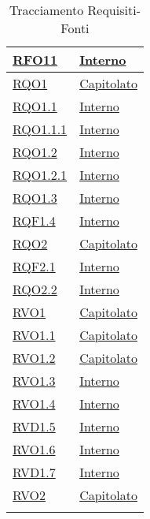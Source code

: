 \begin{longtable}{|>{\centering}m{5cm}|m{5cm}<{\centering}|}
\hyperlink{RFO11}{RFO11} &  \hyperlink{Interno}{Interno}\\ \hline

\hyperlink{RQO1}{RQO1} & \hyperlink{Capitolato}{Capitolato}\\ \hline
\hyperlink{RQO1.1}{RQO1.1} &  \hyperlink{Interno}{Interno}\\ \hline

\hyperlink{RQO1.1.1}{RQO1.1.1} &  \hyperlink{Interno}{Interno}\\ \hline

\hyperlink{RQO1.2}{RQO1.2} & \hyperlink{Interno}{Interno}\\ \hline

\hyperlink{RQO1.2.1}{RQO1.2.1} & \hyperlink{Interno}{Interno}\\ \hline

\hyperlink{RQO1.3}{RQO1.3} &  \hyperlink{Interno}{Interno}\\ \hline

\hyperlink{RQF1.4}{RQF1.4} & \hyperlink{Interno}{Interno}\\ \hline

\hyperlink{RQO2}{RQO2} & \hyperlink{Capitolato}{Capitolato}\\ \hline

\hyperlink{RQF2.1}{RQF2.1} & \hyperlink{Interno}{Interno}\\ \hline

\hyperlink{RQO2.2}{RQO2.2} & \hyperlink{Interno}{Interno}\\ \hline

\hyperlink{RVO1}{RVO1} &  \hyperlink{Capitolato}{Capitolato}\\ \hline

\hyperlink{RVO1.1}{RVO1.1} & \hyperlink{Capitolato}{Capitolato}\\ \hline

\hyperlink{RVO1.2}{RVO1.2} & \hyperlink{Capitolato}{Capitolato}\\ \hline

\hyperlink{RVO1.3}{RVO1.3} & \hyperlink{Interno}{Interno}\\ \hline

\hyperlink{RVO1.4}{RVO1.4} &\hyperlink{Interno}{Interno}\\ \hline

\hyperlink{RVD1.5}{RVD1.5} &  \hyperlink{Interno}{Interno}\\ \hline

\hyperlink{RVO1.6}{RVO1.6} &  \hyperlink{Interno}{Interno}\\ \hline

\hyperlink{RVD1.7}{RVD1.7} & \hyperlink{Interno}{Interno}\\ \hline

\hyperlink{RVO2}{RVO2} &  \hyperlink{Capitolato}{Capitolato}\\ \hline

\caption[Tracciamento Requisiti-Fonti]{Tracciamento Requisiti-Fonti}
\label{tabella:requi-fonti}
\end{longtable}
\clearpage

